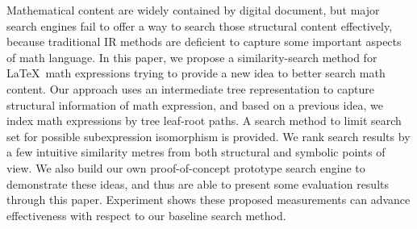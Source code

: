 Mathematical content are widely contained by digital document, but major search engines fail to offer a way to search those structural content effectively, because traditional IR methods are deficient to capture some important aspects of math language. 
In this paper, we propose a similarity-search method for \LaTeX\ math expressions trying to provide a new idea to better search math content.
Our approach uses an intermediate tree representation to capture structural information of math expression, and based on a previous idea, we index math expressions by tree leaf-root paths. 
A search method to limit search set for possible subexpression isomorphism is provided.
We rank search results by a few intuitive similarity metres from both structural and symbolic points of view. 
We also build our own proof-of-concept prototype search engine to demonstrate these ideas, and thus are able to present some evaluation results through this paper.
Experiment shows these proposed measurements can advance effectiveness with respect to our baseline search method.
